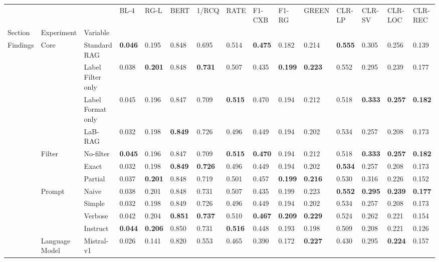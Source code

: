 \begin{tabular}{lllllllllllllll}
\toprule
 &  &  & BL-4 & RG-L & BERT & 1/RCQ & RATE & F1-CXB & F1-RG & GREEN & CLR-LP & CLR-SV & CLR-LOC & CLR-REC \\
Section & Experiment & Variable &  &  &  &  &  &  &  &  &  &  &  &  \\
\midrule
\multirow[c]{23}{*}{Findings} & \multirow[c]{4}{*}{Core} & Standard RAG & \textbf{0.046} & 0.195 & 0.848 & 0.695 & 0.514 & \textbf{0.475} & 0.182 & 0.214 & \textbf{0.555} & 0.305 & 0.256 & 0.139 \\
 &  & Label Filter only & 0.038 & \textbf{0.201} & 0.848 & \textbf{0.731} & 0.507 & 0.435 & \textbf{0.199} & \textbf{0.223} & 0.552 & 0.295 & 0.239 & 0.177 \\
 &  & Label Format only & 0.045 & 0.196 & 0.847 & 0.709 & \textbf{0.515} & 0.470 & 0.194 & 0.212 & 0.518 & \textbf{0.333} & \textbf{0.257} & \textbf{0.182} \\
 &  & LaB-RAG & 0.032 & 0.198 & \textbf{0.849} & 0.726 & 0.496 & 0.449 & 0.194 & 0.202 & 0.534 & 0.257 & 0.208 & 0.173 \\
\cmidrule{2-15}
 & \multirow[c]{3}{*}{Filter} & No-filter & \textbf{0.045} & 0.196 & 0.847 & 0.709 & \textbf{0.515} & \textbf{0.470} & 0.194 & 0.212 & 0.518 & \textbf{0.333} & \textbf{0.257} & \textbf{0.182} \\
 &  & Exact & 0.032 & 0.198 & \textbf{0.849} & \textbf{0.726} & 0.496 & 0.449 & 0.194 & 0.202 & \textbf{0.534} & 0.257 & 0.208 & 0.173 \\
 &  & Partial & 0.037 & \textbf{0.201} & 0.848 & 0.719 & 0.501 & 0.457 & \textbf{0.199} & \textbf{0.216} & 0.530 & 0.316 & 0.226 & 0.152 \\
\cmidrule{2-15}
 & \multirow[c]{4}{*}{Prompt} & Naive & 0.038 & 0.201 & 0.848 & 0.731 & 0.507 & 0.435 & 0.199 & 0.223 & \textbf{0.552} & \textbf{0.295} & \textbf{0.239} & \textbf{0.177} \\
 &  & Simple & 0.032 & 0.198 & 0.849 & 0.726 & 0.496 & 0.449 & 0.194 & 0.202 & 0.534 & 0.257 & 0.208 & 0.173 \\
 &  & Verbose & 0.042 & 0.204 & \textbf{0.851} & \textbf{0.737} & 0.510 & \textbf{0.467} & \textbf{0.209} & \textbf{0.229} & 0.524 & 0.262 & 0.221 & 0.154 \\
 &  & Instruct & \textbf{0.044} & \textbf{0.206} & 0.850 & 0.731 & \textbf{0.516} & 0.448 & 0.193 & 0.198 & 0.509 & 0.208 & 0.221 & 0.126 \\
\cmidrule{2-15}
 & \multirow[c]{3}{*}{Language Model} & Mistral-v1 & 0.026 & 0.141 & 0.820 & 0.553 & 0.465 & 0.390 & 0.172 & \textbf{0.227} & 0.430 & 0.295 & \textbf{0.224} & 0.157 \\

\end{tabular}
